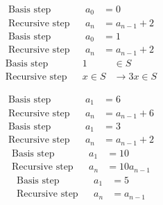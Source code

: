\documentclass{article}
\numberwithin{subcase}{case}
\begin{document}
\begin{outline}[enumerate]
    \1 
        \2 \begin{equation}
            \begin{aligned}
                \text{Basis step}&& a_0 &= 0 \\
                \text{Recursive step}&& a_n &= a_{n-1} + 2
            \end{aligned}
        \end{equation}
        \2 \begin{equation}
            \begin{aligned}
                \text{Basis step}&&a_0 &= 1 \\
                \text{Recursive step}&&a_n &= a_{n-1} + 2
            \end{aligned}
        \end{equation}
        \2 \begin{equation}
            \begin{aligned}
                \text{Basis step}&&1 &\in S \\
                \text{Recursive step}&&x \in S &\rightarrow 3x \in S
            \end{aligned}
        \end{equation}
    
    \1 
        \2 \begin{equation}
            \begin{aligned}
                \text{Basis step}&& a_1 &= 6  \\
                \text{Recursive step}&& a_n &= a_{n-1} + 6
            \end{aligned}
        \end{equation}
        \2 \begin{equation}
            \begin{aligned}
                \text{Basis step}&& a_1 &= 3  \\
                \text{Recursive step}&& a_n &= a_{n-1} + 2
            \end{aligned}
        \end{equation}
        \2 \begin{equation}
            \begin{aligned}
                \text{Basis step}&& a_1 &= 10 \\
                \text{Recursive step}&& a_n &= 10a_{n-1}
            \end{aligned}
        \end{equation}
        \2 \begin{equation}
            \begin{aligned}
                \text{Basis step}&& a_1 &= 5 \\
                \text{Recursive step}&& a_n &= a_{n-1}
            \end{aligned}
        \end{equation}
    

\end{outline}
\end{document}
